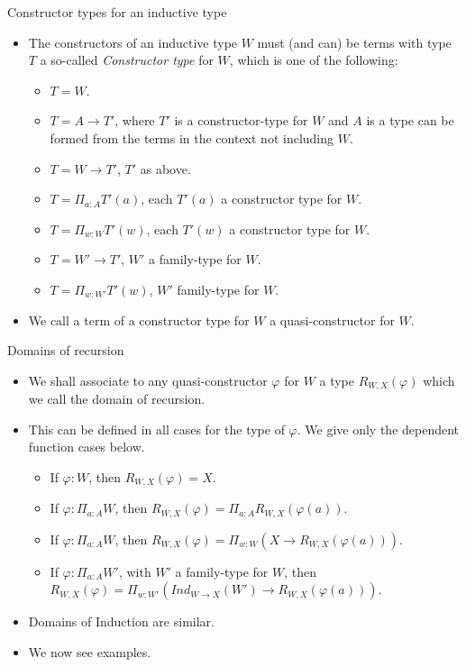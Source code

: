 \documentclass[10 pt., handout]{beamer}
\theoremstyle{plain}
\theoremstyle{remark}
\begin{document}
\begin{frame}{Constructor types for an inductive type}

\begin{itemize}

\item The constructors of an inductive type $W$ must (and can) be terms with type $T$ a so-called \emph{Constructor type} for $W$, which is one of the following:
\begin{itemize}
\item $T = W$.
\item $T = A \to T'$, where $T'$ is a constructor-type for $W$ and $A$ is a type can be formed from the terms in the context not including $W$.
\item $T = W \to T'$, $T'$ as above.
\item $T = \Pi_{a : A} T'(a)$, each $T'(a)$ a constructor type for $W$.
\item $T = \Pi_{w : W} T'(w)$, each $T'(w)$ a constructor type for $W$.
\item $T = W' \to T'$, $W'$ a family-type for $W$.
\item $T = \Pi_{w : W'} T'(w)$, $W'$ family-type for $W$.
\end{itemize}

\item We call a term of a constructor type for $W$ a quasi-constructor for $W$.

\end{itemize}

\end{frame}



\begin{frame}{Domains of recursion}

\begin{itemize}

\item We shall associate to any quasi-constructor $\varphi$ for $W$ a type $R_{W, X}(\varphi)$ which we call the domain of recursion. 
\item This can be defined in all cases for the type of $\varphi$. We give only the dependent function cases below.
\begin{itemize}
\item If $\varphi : W$, then $R_{W, X}(\varphi) = X$.
\item If $\varphi : \Pi_{a : A} W$, then $R_{W, X}(\varphi) = \Pi_{a : A} R_{W, X}(\varphi(a))$.
\item If $\varphi : \Pi_{a : A} W$, then $R_{W, X}(\varphi) = \Pi_{w : W} (X \to R_{W, X}(\varphi(a)))$.
\item If $\varphi : \Pi_{a : A} W'$, with $W'$ a family-type for $W$, then $R_{W, X}(\varphi) = \Pi_{w : W'} (Ind_{W \to X}(W') \to R_{W, X}(\varphi(a)))$.
\end{itemize}

\item Domains of Induction are similar.

\item We now see examples.

\end{itemize}

\end{frame}
\end{document}
